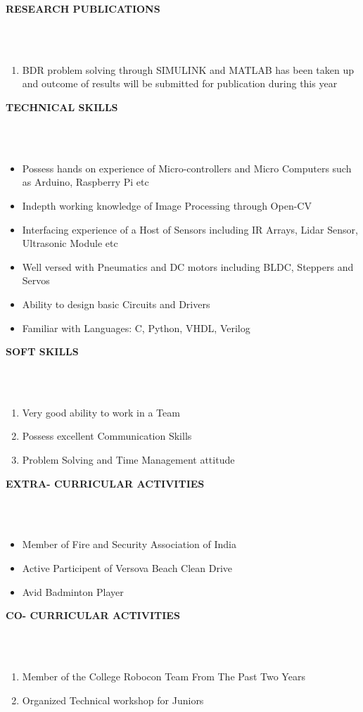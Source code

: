 \documentclass[a4paper,10pt]{article}
\newcommand{\lsep}{-0.5cm}
\newcommand{\resheading}[1]{{\small \colorbox{mygrey}{\begin{minipage}{0.975\textwidth}{\textbf{#1 \vphantom{p\^{E}}}}\end{minipage}}}}
\begin{document}
\resheading{\textbf{RESEARCH PUBLICATIONS} }\\\\[\lsep]
\begin{enumerate}
\item BDR problem solving through SIMULINK and MATLAB has been taken up and outcome of results will be submitted for publication during this year
\end{enumerate}

\resheading{\textbf{TECHNICAL SKILLS} }\\\\[\lsep]
\begin{itemize}
\item Possess hands on experience of Micro-controllers and Micro Computers such as Arduino, Raspberry Pi etc
\item Indepth working knowledge of Image Processing through Open-CV
\item Interfacing experience of a Host of Sensors including IR Arrays, Lidar Sensor, Ultrasonic Module etc
\item Well versed with Pneumatics and  DC motors including BLDC, Steppers and Servos
\item Ability to design basic Circuits and Drivers
\item Familiar with Languages: C, Python, VHDL, Verilog
\end{itemize}

\resheading{\textbf{SOFT SKILLS} }\\\\[\lsep]
\begin{enumerate}
\item Very good ability to work in a Team
\item Possess excellent Communication Skills
\item Problem Solving and Time Management attitude
\end{enumerate}

\resheading{\textbf{EXTRA- CURRICULAR ACTIVITIES} }\\\\[\lsep]
\begin{itemize}
\item Member of Fire and Security Association of India
\item Active Participent of Versova Beach Clean Drive
\item Avid Badminton Player
\end{itemize}

\resheading{\textbf{CO- CURRICULAR ACTIVITIES} }\\\\[\lsep]
\begin{enumerate}
\item Member of the College Robocon Team From The Past Two Years
\item Organized Technical workshop for Juniors
\end{enumerate}
\end{document}
